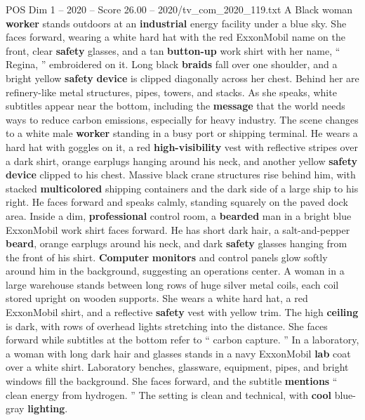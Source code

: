 \begin{textsample}{POS Dim 1 – 2020 – Score 26.00 – 2020/tv\_com\_2020\_119.txt}  \label{ex:f1_pos_002}
A Black woman \textbf{worker} stands outdoors at an \textbf{industrial} energy facility under a blue sky.
She faces forward, wearing a white hard hat with the red ExxonMobil name on the front, clear \textbf{safety} glasses, and a tan \textbf{button-up} work shirt with her name, “ Regina, ” embroidered on it.
Long black \textbf{braids} fall over one shoulder, and a bright yellow \textbf{safety} \textbf{device} is clipped diagonally across her chest.
Behind her are refinery-like metal structures, pipes, towers, and stacks.
As she speaks, white subtitles appear near the bottom, including the \textbf{message} that the world needs ways to reduce carbon emissions, especially for heavy industry.
The scene changes to a white male \textbf{worker} standing in a busy port or shipping terminal.
He wears a hard hat with goggles on it, a red \textbf{high-visibility} vest with reflective stripes over a dark shirt, orange earplugs hanging around his neck, and another yellow \textbf{safety} \textbf{device} clipped to his chest.
Massive black crane structures rise behind him, with stacked \textbf{multicolored} shipping containers and the dark side of a large ship to his right.
He faces forward and speaks calmly, standing squarely on the paved dock area.
Inside a dim, \textbf{professional} control room, a \textbf{bearded} man in a bright blue ExxonMobil work shirt faces forward.
He has short dark hair, a salt-and-pepper \textbf{beard}, orange earplugs around his neck, and dark \textbf{safety} glasses hanging from the front of his shirt. \textbf{Computer} \textbf{monitors} and control panels glow softly around him in the background, suggesting an operations center.
A woman in a large warehouse stands between long rows of huge silver metal coils, each coil stored upright on wooden supports.
She wears a white hard hat, a red ExxonMobil shirt, and a reflective \textbf{safety} vest with yellow trim.
The high \textbf{ceiling} is dark, with rows of overhead lights stretching into the distance.
She faces forward while subtitles at the bottom refer to “ carbon capture. ” In a laboratory, a woman with long dark hair and glasses stands in a navy ExxonMobil \textbf{lab} coat over a white shirt.
Laboratory benches, glassware, equipment, pipes, and bright windows fill the background.
She faces forward, and the subtitle \textbf{mentions} “ clean energy from hydrogen. ” The setting is clean and technical, with \textbf{cool} blue-gray \textbf{lighting}.

\end{textsample}
